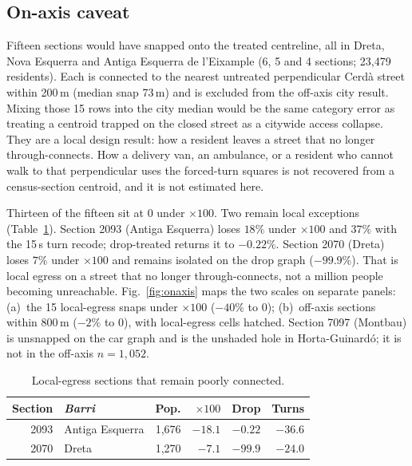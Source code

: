 \documentclass[a4paper,fleqn]{cas-dc}
\begin{document}
\subsection{On-axis caveat}

Fifteen sections would have snapped onto the treated centreline, all in
Dreta, Nova Esquerra and Antiga Esquerra de l'Eixample (6, 5 and 4
sections; 23{,}479 residents). Each is connected to the nearest untreated
perpendicular Cerd\`a street within 200\,m (median snap 73\,m) and is excluded from the off-axis
city result. Mixing those 15 rows into the city median would be the same
category error as treating a centroid trapped on the closed street as a
citywide access collapse. They are a local design result: how a resident
leaves a street that no longer through-connects. How a delivery van, an
ambulance, or a resident who cannot walk to that perpendicular uses the
forced-turn squares is not recovered from a census-section centroid, and it
is not estimated here.

Thirteen of the fifteen sit at $0$ under $\times 100$. Two
remain local exceptions (Table~\ref{tab:stubborn}). Section 2093 (Antiga
Esquerra) loses $18\%$ under $\times 100$ and $37\%$ with the 15\,s turn
recode; drop-treated returns it to $-0.22\%$. Section 2070 (Dreta) loses
$7\%$ under $\times 100$ and remains isolated on the drop graph
($-99.9\%$). That is local egress on a street that no longer
through-connects, not a million people becoming unreachable.
Fig.~\ref{fig:onaxis} maps the two scales on separate panels: (a)~the 15
local-egress snaps under $\times 100$ ($-40\%$ to 0); (b)~off-axis sections
within 800\,m ($-2\%$ to 0), with local-egress cells hatched. Section 7097 (Montbau)
is unsnapped on the car graph and is the unshaded hole in
Horta-Guinard\'o; it is not in the off-axis $n = 1{,}052$.

\begin{table}[!htbp]
\centering
\small
\caption{Local-egress sections that remain poorly connected.}
\label{tab:stubborn}
\setlength{\tabcolsep}{3pt}
\begin{tabular}{@{}rlrrrr@{}}
\toprule
Section & \emph{Barri} & Pop. & $\times 100$ & Drop & Turns \\
\midrule
2093 & Antiga Esquerra & 1{,}676 & $-18.1$ & $-0.22$ & $-36.6$ \\
2070 & Dreta & 1{,}270 & $-7.1$ & $-99.9$ & $-24.0$ \\
\bottomrule
\end{tabular}
\end{table}
\end{document}
